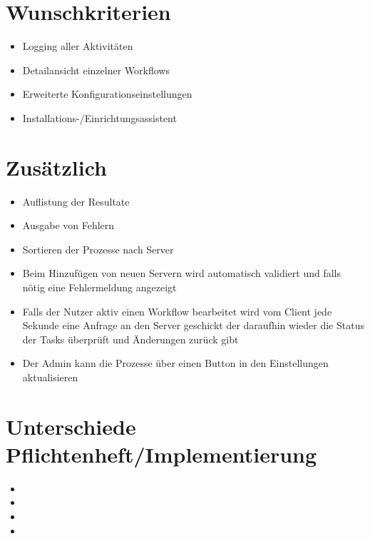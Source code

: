     \section{Wunschkriterien}
    
        \begin{itemize}
			\item Logging aller Aktivitäten
			\item Detailansicht einzelner Workflows
			\item Erweiterte Konfigurationseinstellungen
			\item Installations-/Einrichtungsassistent
		\end{itemize}
    
    \section{Zusätzlich}
    
        \begin{itemize}
            \item Auflistung der Resultate
            \item Ausgabe von Fehlern
            \item Sortieren der Prozesse nach Server
            \item Beim Hinzufügen von neuen Servern wird automatisch validiert und falls nötig eine Fehlermeldung angezeigt
            \item Falls der Nutzer aktiv einen Workflow bearbeitet wird vom Client jede Sekunde eine Anfrage an den Server geschickt der daraufhin wieder die Status der Tasks überprüft und Änderungen zurück gibt
            \item Der Admin kann die Prozesse über einen Button in den Einstellungen aktualisieren
        \end{itemize}


    \section{Unterschiede Pflichtenheft/Implementierung}
        
        \begin{itemize}
            \item 
            \item 
            \item 
            \item 
        \end{itemize}